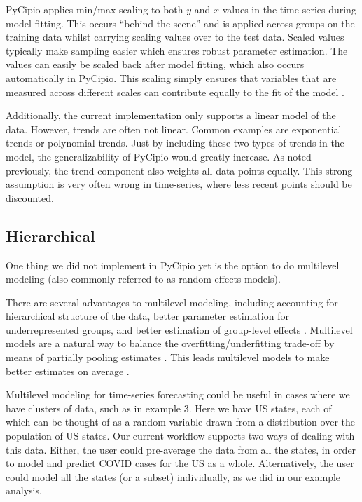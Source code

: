 \documentclass{article}
\begin{document}
PyCipio applies min/max-scaling to both $y$ and $x$ values in the time series during model fitting. This occurs “behind the scene” and is applied across groups on the training data whilst carrying scaling values over to the test data. Scaled values typically make sampling easier which ensures robust parameter estimation. The values can easily be scaled back after model fitting, which also occurs automatically in PyCipio. This scaling simply ensures that variables that are measured across different scales can contribute equally to the fit of the model \cite{Min-Max}. 

Additionally, the current implementation only supports a linear model of the data. However, trends are often not linear. Common examples are exponential trends or polynomial trends. Just by including these two types of trends in the model, the generalizability of PyCipio would greatly increase. As noted previously, the trend component also weights all data points equally. This strong assumption is very often wrong in time-series, where less recent points should be discounted. 

\subsection{Hierarchical}

One thing we did not implement in PyCipio yet is the option to do multilevel modeling (also commonly referred to as random effects models).

There are several advantages to multilevel modeling, including accounting for hierarchical structure of the data, better parameter estimation for underrepresented groups, and better estimation of group-level effects \cite{pymc3}. Multilevel models are a natural way to balance the overfitting/underfitting trade-off by means of partially pooling estimates \cite[p.~14]{McElreath}. This leads multilevel models to make better estimates on average \cite[p.~414]{McElreath}.

Multilevel modeling for time-series forecasting could be useful in cases where we have clusters of data, such as in example 3. Here we have US states, each of which can be thought of as a random variable drawn from a distribution over the population of US states. Our current workflow supports two ways of dealing with this data. Either, the user could pre-average the data from all the states, in order to model and predict COVID cases for the US as a whole. Alternatively, the user could model all the states (or a subset) individually, as we did in our example analysis.
\end{document}
